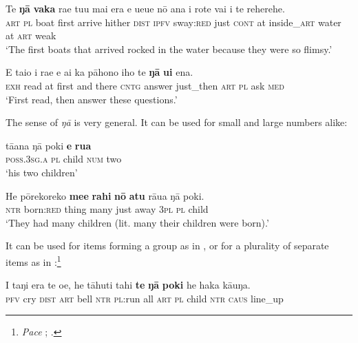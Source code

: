 \ea\label{ex:5.82}
\gll Te \textbf{ŋā} \textbf{vaka} ra{\ꞌ}e tu{\ꞌ}u mai era e ueue nō {\ꞌ}ana {\ꞌ}i rote vai  {\ꞌ}i te reherehe.\\
\textsc{art} \textsc{pl} boat first arrive hither \textsc{dist} \textsc{ipfv} sway:\textsc{red} just \textsc{cont} at inside\_\textsc{art} water  at \textsc{art} weak\\

\glt 
‘The first boats that arrived rocked in the water because they were so flimsy.’ \textstyleExampleref{[R539-1.550]}
\z

\ea\label{ex:5.83}
\gll E tai{\ꞌ}o {\ꞌ}i ra{\ꞌ}e {\ꞌ}e {\ꞌ}ai ka pāhono iho te \textbf{ŋā} \textbf{{\ꞌ}ui} ena. \\
\textsc{exh} read at first and there \textsc{cntg} answer just\_then \textsc{art} \textsc{pl} ask \textsc{med} \\

\glt
‘First read, then answer these questions.’ \textstyleExampleref{[R534.013]} 
\z

The sense of \textit{ŋā} is very general. It can be used for small and large numbers alike:

\ea\label{ex:5.84}
\gll tā{\ꞌ}ana ŋā poki \textbf{e} \textbf{rua} \\
\textsc{poss.3sg.a} \textsc{pl} child \textsc{num} two \\

\glt 
‘his two children’ \textstyleExampleref{[R376.033]} 
\z

\ea\label{ex:5.85}
\gll He pōrekoreko \textbf{me{\ꞌ}e} \textbf{rahi} \textbf{nō} \textbf{atu} rāua ŋā poki. \\
\textsc{ntr} born:\textsc{red} thing many just away \textsc{3pl} \textsc{pl} child \\

\glt
‘They had many children (lit. many their children were born).’ \textstyleExampleref{[R438.049]} 
\z

It can be used for items forming a group as in , or for a plurality of separate items as in :\footnote{\label{fn:264}\textit{Pace} \citet[135]{DuFeu1996}; \citet[485]{DuFeu1987}.}

\ea\label{ex:5.86}
\gll I taŋi era te oe, he tāhuti tahi \textbf{te} \textbf{ŋā} \textbf{poki} he haka kāuŋa. \\
\textsc{pfv} cry \textsc{dist} \textsc{art} bell \textsc{ntr} \textsc{pl}:run all \textsc{art} \textsc{pl} child \textsc{ntr} \textsc{caus} line\_up \\

